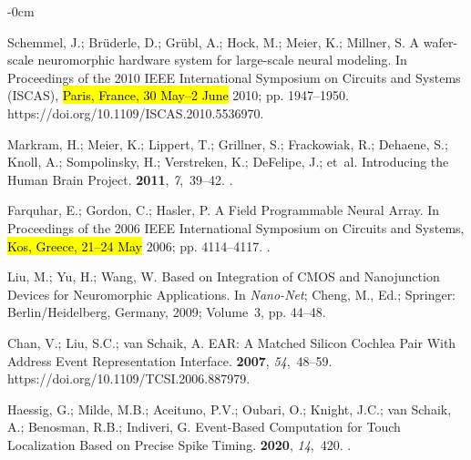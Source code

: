 \documentclass[brainsci, %
               review,accept,pdftex,moreauthors
               ]{Definitions/mdpi}
\begin{document}
\begin{adjustwidth}{-\extralength}{0cm}
\begin{thebibliography}{999}
Schemmel, J.; Brüderle, D.; Grübl, A.; Hock, M.; Meier, K.; Millner, S.
\newblock A wafer-scale neuromorphic hardware system for large-scale neural
  modeling.
\newblock In Proceedings of the 2010 {IEEE} {International} {Symposium} on
  {Circuits} and {Systems} ({ISCAS}), \hl{Paris, France, 30 May--2 June} %
 2010; pp. 1947--1950.
{{https://doi.org/10.1109/ISCAS.2010.5536970}}.

Markram, H.; Meier, K.; Lippert, T.; Grillner, S.; Frackowiak, R.; Dehaene, S.;
  Knoll, A.; Sompolinsky, H.; Verstreken, K.; DeFelipe, J.;  et~al.
\newblock Introducing the {Human} {Brain} {Project}.
 {\bf 2011}, {\em 7},~39--42.
.

Farquhar, E.; Gordon, C.; Hasler, P.
\newblock A {Field} {Programmable} {Neural} {Array}.
\newblock In Proceedings of the 2006 {IEEE} {International} {Symposium} on
  {Circuits} and {Systems}, \hl{Kos, Greece, 21--24 May} %
 2006; pp. 4114--4117.
.

Liu, M.; Yu, H.; Wang, W.
 {Based} on {Integration} of {CMOS} and {Nanojunction}
  {Devices} for {Neuromorphic} {Applications}. In {\em Nano-{Net}}; Cheng, M.,
  Ed.; Springer: Berlin/Heidelberg, Germany,  2009; Volume~3, pp.
  44--48.

Chan, V.; Liu, S.C.; van Schaik, A.
 {EAR}: {A} {Matched} {Silicon} {Cochlea} {Pair} {With}
  {Address} {Event} {Representation} {Interface}.
  {\bf 2007}, {\em 54},~48--59.
  {{https://doi.org/10.1109/TCSI.2006.887979}}.

Haessig, G.; Milde, M.B.; Aceituno, P.V.; Oubari, O.; Knight, J.C.; van Schaik,
  A.; Benosman, R.B.; Indiveri, G.
\newblock Event-{Based} {Computation} for {Touch} {Localization} {Based} on
  {Precise} {Spike} {Timing}.
 {\bf 2020}, {\em 14},~420.
.


\end{thebibliography}
\end{adjustwidth}
\end{document}
